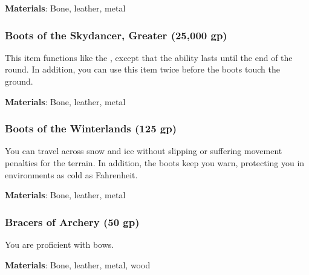 \vspace{0.25em}
\textbf{Materials}: Bone, leather, metal


\lowercase{\hypertarget{item:Boots of the Skydancer, Greater}{}}\label{item:Boots of the Skydancer, Greater}
\hypertarget{item:Boots of the Skydancer, Greater}{\subsubsection{Boots of the Skydancer, Greater\hfill{} (25,000 gp)}}

This item functions like the , except that the ability lasts until the end of the round.
In addition, you can use this item twice before the boots touch the ground.



\vspace{0.25em}
\textbf{Materials}: Bone, leather, metal


\lowercase{\hypertarget{item:Boots of the Winterlands}{}}\label{item:Boots of the Winterlands}
\hypertarget{item:Boots of the Winterlands}{\subsubsection{Boots of the Winterlands\hfill{} (125 gp)}}

You can travel across snow and ice without slipping or suffering movement penalties for the terrain.
In addition, the boots keep you warn, protecting you in environments as cold as  Fahrenheit.



\vspace{0.25em}
\textbf{Materials}: Bone, leather, metal


\lowercase{\hypertarget{item:Bracers of Archery}{}}\label{item:Bracers of Archery}
\hypertarget{item:Bracers of Archery}{\subsubsection{Bracers of Archery\hfill{} (50 gp)}}

You are proficient with bows.



\vspace{0.25em}
\textbf{Materials}: Bone, leather, metal, wood


